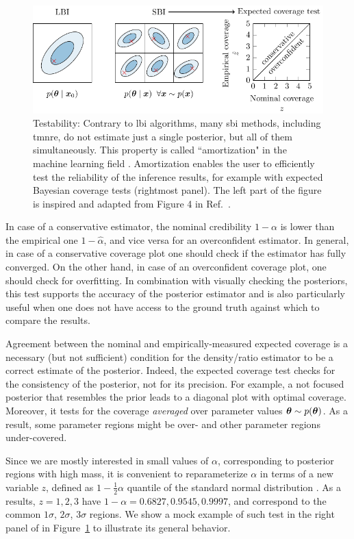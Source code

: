 \begin{figure}
	\centering
	\includegraphics[width=\linewidth]{TikZ/sbi_test.pdf}
	\caption{Testability: Contrary to \gls*{lbi} algorithms, many \gls*{sbi} methods, including \gls*{tmnre}, do not estimate just a single posterior, but all of them simultaneously. This property is called ``amortization" in the machine learning field \cite{amos2023tutorial}. Amortization enables the user to efficiently test the reliability of the inference results, for example with expected Bayesian coverage tests ({rightmost panel}). The left part of the figure is inspired and adapted from Figure 4 in Ref.~\cite{Cole:2021gwr}.
}
\label{fig:sbi-test}
\end{figure}


In case of a conservative estimator, the nominal credibility $1-\alpha$ is lower than the empirical one $1-\hat\alpha$, and vice versa for an overconfident estimator. In general, in case of a conservative coverage plot one should check if the estimator has fully converged. On the other hand, in case of an overconfident coverage plot, one should check for overfitting. In combination with visually checking the posteriors, this test supports the accuracy of the posterior estimator and is also particularly useful when one does not have access to the ground truth against which to compare the results. 

Agreement between the nominal and empirically-measured expected coverage is a necessary (but not sufficient) condition for the density/ratio estimator to be a correct estimate of the posterior. Indeed, the expected coverage test checks for the consistency of the posterior, not for its precision. For example, a not focused posterior that resembles the prior leads to a diagonal plot with optimal coverage. Moreover, it tests for the coverage \emph{averaged} over parameter values $\bm{\theta} \sim p(\bm{\theta})$. As a result, some parameter regions might be over- and other parameter regions under-covered.

Since we are mostly interested in small values of $\alpha$, corresponding to posterior regions with high mass, it is convenient to reparameterize $\alpha$ in terms of a new variable $z$, defined as $1-\frac12 \alpha$ quantile of the standard normal distribution \cite{Cole:2021gwr}. As a results,  $z = 1, 2, 3$ have $1-\alpha = 0.6827, 0.9545, 0.9997$, and correspond to the common $1\sigma$, $2\sigma$, $3\sigma$ regions. We show a mock example of such test in the right panel of in Figure~\ref{fig:sbi-test} to illustrate its general behavior.


